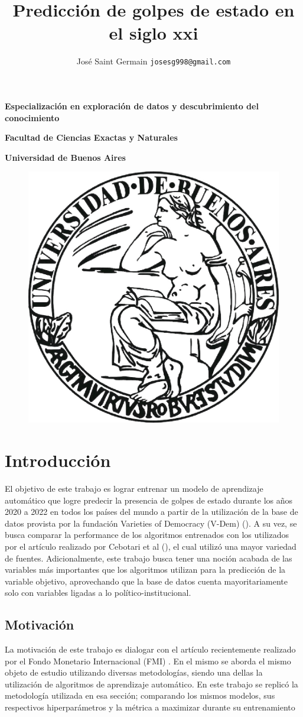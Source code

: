 \documentclass{article}
\title{Predicción de golpes de estado en el siglo xxi}
\author{José Saint Germain \texttt{josesg998@gmail.com} }
\begin{document}
\maketitle

\textbf{\Large Especialización en exploración de datos y descubrimiento del conocimiento}

\textbf{\Large Facultad de Ciencias Exactas y Naturales}

\textbf{\Large Universidad de Buenos Aires}

\begin{figure}[H]
  \centering  
  \includegraphics[width=.5\textwidth]{0_portada.jpg}
\end{figure}

\pagebreak
\tableofcontents
\pagebreak

\section{Introducción}
El objetivo de este trabajo es lograr entrenar un modelo de aprendizaje automático
que logre predecir la presencia de golpes de estado durante los años 
2020 a 2022 en todos los países del mundo a partir de la utilización de la base de datos 
provista por la fundación Varieties of Democracy (V-Dem) (\cite{Cop24}). A su vez, se 
busca comparar la performance de los algoritmos entrenados con los utilizados por el artículo
realizado por Cebotari et al (\cite{Ceb24}), el cual utilizó una mayor variedad de fuentes. 
Adicionalmente, este trabajo busca tener una noción acabada de las variables más importantes 
que los algoritmos utilizan para la predicción de la variable objetivo, aprovechando que la
base de datos cuenta mayoritariamente solo con variables ligadas a lo político-institucional.

\subsection{Motivación}
La motivación de este trabajo es dialogar con el artículo recientemente realizado por el 
Fondo Monetario Internacional (FMI) \cite{Ceb24}. En el mismo se aborda el mismo objeto 
de estudio utilizando diversas metodologías, siendo una dellas la utilización de 
algoritmos de aprendizaje automático. En este trabajo se replicó la metodología utilizada 
en esa sección; comparando los mismos modelos, sus respectivos hiperparámetros y la 
métrica a maximizar durante su entrenamiento
\end{document}
